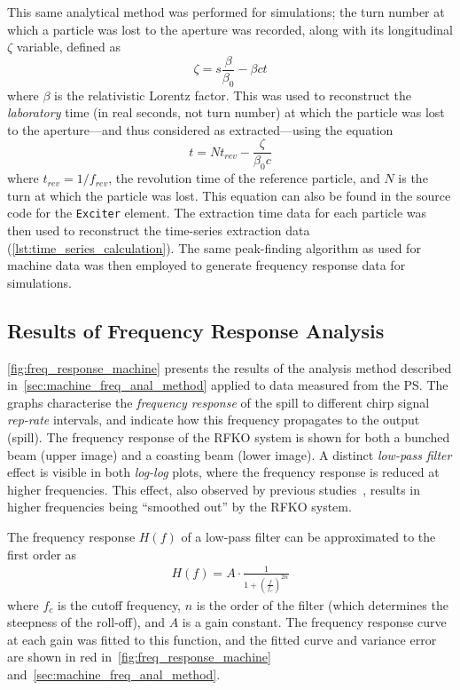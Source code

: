\documentclass[a4paper,twoside,11pt]{report}
\begin{document}
This same analytical method was performed for simulations; the turn number at which a particle was lost to the aperture was recorded, along with its longitudinal $\zeta$ variable, defined as
\begin{equation}
  \zeta = s \frac{\beta}{\beta_0} - \beta c t
\end{equation}
where $\beta$ is the relativistic Lorentz factor. This was used to reconstruct the \textit{laboratory} time (in real seconds, not turn number) at which the particle was lost to the aperture---and thus considered as extracted---using the equation
\begin{equation}
  t = N t_{rev} - \frac\zeta{\beta_0 c}
\end{equation}
where $t_{rev}=1/f_{rev}$, the revolution time of the reference particle, and $N$ is the turn at which the particle was lost. This equation can also be found in the source code for the \verb|Exciter| element. The extraction time data for each particle was then used to reconstruct the time-series extraction data (\autoref{lst:time_series_calculation}). The same peak-finding algorithm as used for machine data was then employed to generate frequency response data for simulations.


\subsection{Results of Frequency Response Analysis}
\autoref{fig:freq_response_machine} presents the results of the analysis method described in~\autoref{sec:machine_freq_anal_method} applied to data measured from the PS. The graphs characterise the \textit{frequency response} of the spill to different chirp signal \textit{rep-rate} intervals, and indicate how this frequency propagates to the output (spill). The frequency response of the RFKO system is shown for both a bunched beam (upper image) and a coasting beam (lower image). A distinct \textit{low-pass filter} effect is visible in both \textit{log-log} plots, where the frequency response is reduced at higher frequencies. This effect, also observed by previous studies~\cite{wepmp008,Pari:2780495}, results in higher frequencies being ``smoothed out'' by the RFKO system. 

The frequency response $H(f)$ of a low-pass filter can be approximated to the first order as
\begin{eqnarray}
  H(f) = A\cdot \frac 1{1 + \left( \frac{f}{f_c} \right)^{2n}}
\end{eqnarray}
where $f_c$ is the cutoff frequency, $n$ is the order of the filter (which determines the steepness of the roll-off), and $A$ is a gain constant. The frequency response curve at each gain was fitted to this function, and the fitted curve and variance error are shown in red in~\autoref{fig:freq_response_machine} and~\autoref{sec:machine_freq_anal_method}.
\end{document}
